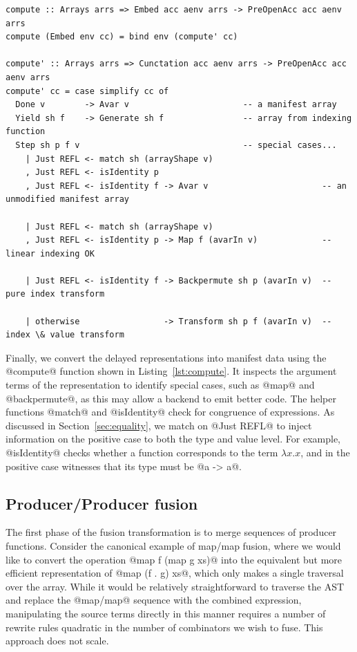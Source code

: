 \begin{lstlisting}[style=haskell_float
    ,label=lst:compute
    ,caption={Computing the delayed representation to a manifest array}]
compute :: Arrays arrs => Embed acc aenv arrs -> PreOpenAcc acc aenv arrs
compute (Embed env cc) = bind env (compute' cc)

compute' :: Arrays arrs => Cunctation acc aenv arrs -> PreOpenAcc acc aenv arrs
compute' cc = case simplify cc of
  Done v        -> Avar v                       -- a manifest array
  Yield sh f    -> Generate sh f                -- array from indexing function
  Step sh p f v                                 -- special cases...
    | Just REFL <- match sh (arrayShape v)
    , Just REFL <- isIdentity p
    , Just REFL <- isIdentity f -> Avar v                       -- an unmodified manifest array

    | Just REFL <- match sh (arrayShape v)
    , Just REFL <- isIdentity p -> Map f (avarIn v)             -- linear indexing OK

    | Just REFL <- isIdentity f -> Backpermute sh p (avarIn v)  -- pure index transform

    | otherwise                 -> Transform sh p f (avarIn v)  -- index \& value transform
\end{lstlisting}

Finally, we convert the delayed representations into manifest data using the
@compute@ function shown in Listing~\ref{lst:compute}. It inspects the argument
terms of the representation to identify special cases, such as @map@ and
@backpermute@, as this may allow a backend to emit better code.
%
The helper functions @match@ and @isIdentity@ check for congruence of
expressions. As discussed in Section~\ref{sec:equality}, we match on @Just REFL@
to inject information on the positive case to both the type and value level. For
example, @isIdentity@ checks whether a function corresponds to the term $\lambda
x.x$, and in the positive case witnesses that its type must be @a -> a@.


\subsection{Producer/Producer fusion}
\label{sec:producer_producer_fusion}
\fusion[producer|(]{}

The first phase of the fusion transformation is to merge sequences of producer
functions. Consider the canonical example of map/map fusion, where we would like
to convert the operation @map f (map g xs)@ into the equivalent but more
efficient representation of @map (f . g) xs@, which only makes a single
traversal over the array. While it would be relatively straightforward to
traverse the AST and replace the @map/map@ sequence with the combined
expression, manipulating the source terms directly in this manner requires a
number of rewrite rules quadratic in the number of combinators we wish to fuse.
This approach does not scale.

